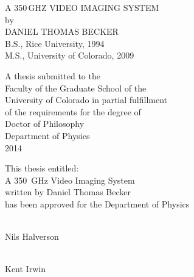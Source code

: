 \documentclass[12pt,letterpaper]{memoir}
\numberwithin{equation}{chapter}
\numberwithin{figure}{chapter}
\numberwithin{table}{chapter}
\begin{document}
\frontmatter


\thispagestyle{empty}
\vspace*{\fill}
\begin{center}
  \DoubleSpacing
  A 350\,GHZ VIDEO IMAGING SYSTEM \\
  by \\
  DANIEL THOMAS BECKER \\
  B.S., Rice University, 1994 \\
  M.S., University of Colorado, 2009
\end{center}
\vspace*{1in}
\begin{center}
  \DoubleSpacing
  A thesis submitted to the\\
  Faculty of the Graduate School of the\\
  University of Colorado in partial fulfillment\\
  of the requirements for the degree of\\
  Doctor of Philosophy \\
  Department of Physics \\
  2014
\end{center}
\vspace*{\fill}
\newpage


\thispagestyle{empty}
\vspace*{\fill}
\begin{center}
  \SingleSpacing
  This thesis entitled:\\
  A \SI{350}{\GHz} Video Imaging System \\
  written by Daniel Thomas Becker \\
  has been approved for the Department of Physics \\
\end{center}

\vspace*{2mm}

\begin{center}
  \normalsize
  \vspace*{16mm}
  \vrule width 80mm height 0.2mm\\
  Nils Halverson
\end{center}

\begin{center}
  \normalsize
  \vspace*{16mm}
  \vrule width 80mm height 0.2mm\\
  Kent Irwin
\end{center}
\end{document}
